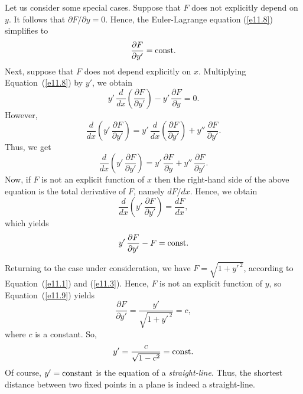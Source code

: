 Let us consider some special cases. Suppose that $F$ does not explicitly
depend on $y$. It follows that $\partial F/\partial y = 0$. Hence,
the Euler-Lagrange equation (\ref{e11.8}) simplifies to
\begin{equation}\label{e11.9}
\frac{\partial F}{\partial y'} = {\rm const}.
\end{equation}
Next, suppose that $F$ does not depend explicitly on $x$. Multiplying
Equation~(\ref{e11.8}) by $y'$, we obtain
\begin{equation}
y'\,\frac{d}{dx}\!\left(\frac{\partial F}{\partial y'}\right)-y'\,\frac{\partial F}{\partial y} = 0.
\end{equation}
However, 
\begin{equation}
\frac{d}{dx}\!\left(y'\,\frac{\partial F}{\partial y'}\right) = y'\,\frac{d}{dx}\!\left(\frac{\partial F}{\partial y'}\right)+ y''\,\frac{\partial F}{\partial y'}.
\end{equation}
Thus, we get
\begin{equation}
\frac{d}{dx}\!\left(y'\,\frac{\partial F}{\partial y'}\right) = y'\,\frac{\partial F}{\partial y} +  y''\,\frac{\partial F}{\partial y'}.
\end{equation}
Now, if $F$ is not an explicit function of $x$ then the right-hand side of
the above equation is the total derivative of $F$, namely $dF/dx$. 
Hence, we obtain
\begin{equation}
\frac{d}{dx}\!\left(y'\,\frac{\partial F}{\partial y'}\right) = \frac{dF}{dx},
\end{equation}
which yields
\begin{equation}\label{e11.14}
y'\,\frac{\partial F}{\partial y'} - F = {\rm const}.
\end{equation}

Returning to the  case under consideration, we have $F = \sqrt{1+y'^{\,2}}$, according to Equation~(\ref{e11.1}) and (\ref{e11.3}).  Hence, $F$ is not
an explicit function of $y$, so Equation~(\ref{e11.9}) yields
\begin{equation}
\frac{\partial F}{\partial y'} = \frac{y'}{\sqrt{1+y'^{\,2}}} = c,
\end{equation}
where $c$ is a constant. So,
\begin{equation}
y' = \frac{c}{\sqrt{1-c^2}} = {\rm const}.
\end{equation}
Of course, $y' = {\rm constant}$ is the equation of a {\em straight-line}. Thus, the shortest distance between two fixed points in a plane is indeed a
straight-line.

